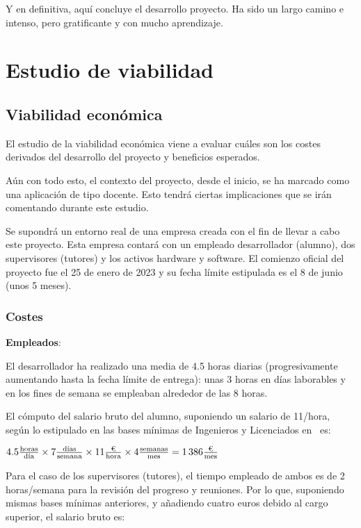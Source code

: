Y en definitiva, aquí concluye el desarrollo proyecto. Ha sido un largo camino e
intenso, pero gratificante y con mucho aprendizaje.

\clearpage
\section{Estudio de viabilidad}

\subsection{Viabilidad económica}

El estudio de la viabilidad económica viene a evaluar cuáles son los costes
derivados del desarrollo del proyecto y beneficios esperados.

Aún con todo esto, el contexto del proyecto, desde el inicio, se ha marcado como
una aplicación de tipo docente. Esto tendrá ciertas implicaciones que se irán
comentando durante este estudio.

Se supondrá un entorno real de una empresa creada con el fin de llevar a cabo
este proyecto. Esta empresa contará con un empleado desarrollador (alumno), dos
supervisores (tutores) y los activos hardware y software. El comienzo oficial
del proyecto fue el 25 de enero de 2023 y su fecha límite estipulada es el 8 de
junio (unos 5 meses). 

\subsubsection{Costes}

\textbf{Empleados}:

El desarrollador ha realizado una media de 4.5 horas diarias (progresivamente
aumentando hasta la fecha límite de entrega): unas 3 horas en días laborables y
en los fines de semana se empleaban alrededor de las 8 horas.

El cómputo del salario bruto del alumno, suponiendo un salario de
11\texteuro/hora, según lo estipulado en las bases mínimas de Ingenieros y
Licenciados en~\cite{cotizacion2023} es:

\begin{center}
$4.5 \frac{\text{horas}}{\text{día}} \times 7 \frac{\text{días}}{\text{semana}} \times 11
\frac{\text{\texteuro}}{\text{hora}} \times 4 \frac{\text{semanas}}{\text{mes}} = 1\,386\frac{\text{\texteuro}}{\text{mes}} $
\end{center}

Para el caso de los supervisores (tutores), el tiempo empleado de ambos es de 2
horas/semana para la revisión del progreso y reuniones. Por lo que, suponiendo
mismas bases mínimas anteriores, y añadiendo cuatro euros debido al cargo
superior, el salario bruto es:

